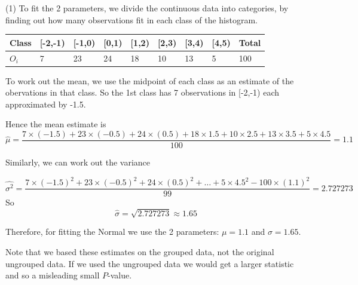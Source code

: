 \documentclass[t,xcolor=pdftex,dvipsnames,table]{beamer}
\begin{document}
\begin{frame}[fragile]{}

\vspace{.5cm}
(1) To fit the 2 parameters, we divide the continuous data into categories, by finding out how many observations fit in each class of the histogram.

\vspace{.5cm}
\begin{tabular}{l|lllllll|l} 
Class & [-2,-1) & [-1,0) & [0,1) & [1,2) & [2,3) & [3,4) & [4,5) & Total  \\ \hline
$O_{i}$ & 7 & 23 & 24 & 18 & 10 & 13 & 5 & 100    \\ \hline
\end{tabular}

\vspace{.5cm}
To work out the mean, we use the midpoint of each class as an estimate of the obervations in that class.
So the 1st class has 7 observations in [-2,-1) each approximated by -1.5. 

\vspace{.5cm}
Hence the mean estimate is 
{\tiny
\[ \hat{\mu} = \frac{7 \times (-1.5) + 23 \times (-0.5) + 24 \times (0.5) + 18 \times 1.5 + 10 \times 2.5 + 13 \times 3.5 + 5 \times 4.5}{100} = 1.1 \]
}
\end{frame}

\begin{frame}[fragile]{}

Similarly, we can work out the variance

{\tiny
\[ \hat{\sigma^2} = \frac{7 \times (-1.5)^2 + 23 \times(-0.5)^2 + 24 \times (0.5)^2 + \ldots + 5 \times 4.5^2 - 100 \times (1.1)^2}{99} = 2.727273 \]
}
So 
\[ \hat{\sigma} = \sqrt{2.727273} \approx 1.65 \]

Therefore, for fitting the Normal we use the 2 parameters: $\mu = 1.1$ and $\sigma = 1.65$.

\vspace{.5cm}
Note that we based these estimates on the grouped data, not the original ungrouped data. If we used the ungrouped data we would get a larger statistic and so a misleading small $P$-value.
\end{frame}
\end{document}
